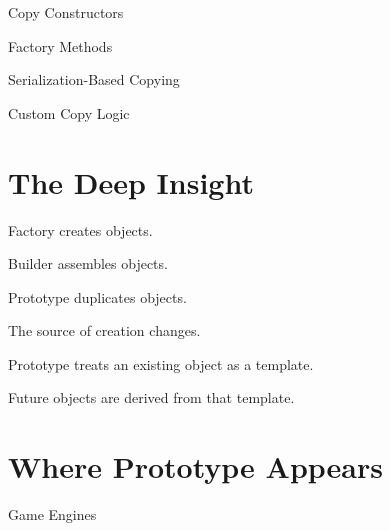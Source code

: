 \documentclass[11pt,a4paper]{book}
\begin{document}
Copy Constructors


Factory Methods


Serialization-Based Copying


Custom Copy Logic


\section{The Deep Insight}

Factory creates objects.


Builder assembles objects.


Prototype duplicates objects.


The source of creation changes.


\begin{idea}

Prototype treats an existing
object as a template.


Future objects are derived
from that template.

\end{idea}


\section{Where Prototype Appears}

Game Engines
\end{document}

